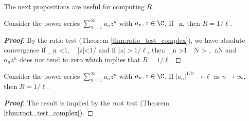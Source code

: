 %
%


The next propositions are useful for computing $R$.

\begin{proposition}\label{pro:ratio_test_convergence_radius}%
Consider the power series $\sum^\infty_{n=1}a_n z^n$ with $a_n,z\in \C$. If 
\be
{}\to \ell \ n\to \infty,
\ee
then $R=1/\ell$.
\end{proposition}

\begin{proof}[{\bf Proof}]
By the ratio test (Theorem \ref{thm:ratio_test_complex}), we have absolute convergence if
\be
\lim_{n\to \infty} <1, \  |z|<1/\ell
\ee
and if $|z|>1/\ell$, then
\be
\lim_{n\to \infty} >1\ \ra\ \exists N > ,\ \forall n\geq N
\ee
and $a_nz^n$ does not tend to zero which implies that $R=1/\ell$.
\end{proof}

\begin{proposition}\label{pro:root_test_convergence_radius}
Consider the power series $\sum^\infty_{n=1}a_n z^n$ with $a_n,z\in \C$. If $|a_n|^{1/n}\to \ell$ as $n\to \infty$, then $R=1/\ell$.
\end{proposition}


\begin{proof}[\bf Proof]
The result is implied by the root test (Theorem \ref{thm:root_test_complex}). %
\end{proof}

